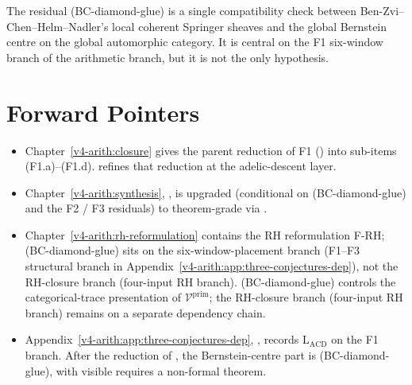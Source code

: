 The residual (BC-diamond-glue) is a single compatibility check
between Ben-Zvi--Chen--Helm--Nadler's local coherent Springer
sheaves and the global Bernstein centre on the global automorphic
category. It is central on the F1 six-window branch of the
arithmetic branch, but it is not the only hypothesis.

\section{Forward Pointers}
\label{v4-arith:acd:forward}

\begin{itemize}
\item Chapter~\ref{v4-arith:closure} gives the parent reduction of F1
() into sub-items (F1.a)--(F1.d).
 refines that reduction
at the adelic-descent layer.
\item Chapter~\ref{v4-arith:synthesis},
, is upgraded (conditional
on (BC-diamond-glue) and the F2 / F3 residuals) to theorem-grade via
.
\item Chapter~\ref{v4-arith:rh-reformulation} contains the RH
reformulation F-RH; (BC-diamond-glue) sits on the six-window-placement
branch (F1--F3 structural branch in
Appendix~\ref{v4-arith:app:three-conjectures-dep}), not the
RH-closure branch (four-input RH branch). (BC-diamond-glue) controls the
categorical-trace presentation of \(\mathcal{V}^{\mathrm{prim}}\);
the RH-closure branch (four-input RH branch)
remains on a separate dependency chain.
\item Appendix~\ref{v4-arith:app:three-conjectures-dep},
, records
\(\mathrm{L}_{\mathrm{ACD}}\) on the F1 branch.  After the reduction of
, the Bernstein-centre part is
(BC-diamond-glue), with visible requires a non-formal theorem.
\end{itemize}
